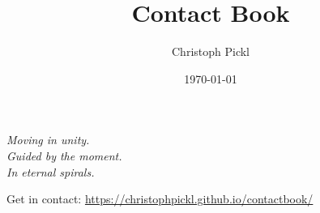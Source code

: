 \documentclass[a4paper,12pt]{book}
\title{Contact Book}
\date{\today}
\author{Christoph Pickl}
\begin{document}

\maketitle

\tableofcontents
\vfill
\begin{center}
	\textit{Moving in unity.}\\
	\textit{Guided by the moment.}\\
	\textit{In eternal spirals.}
\end{center}
\vfill
\noindent
\small{Get in contact: \url{https://christophpickl.github.io/contactbook/}}
\newpage

















\printglossaries
\end{document}
